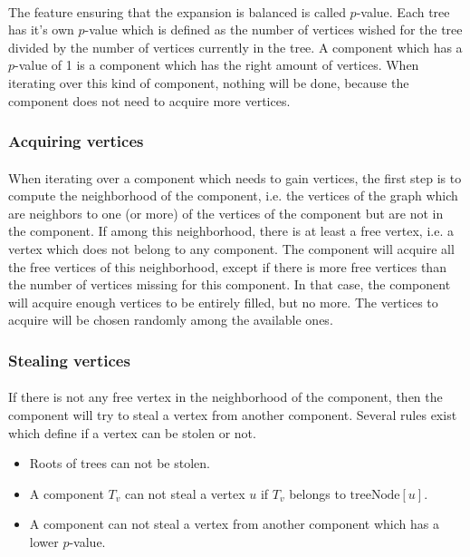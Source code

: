 \paragraph{}
The feature ensuring that the expansion is balanced is called $p$-value. Each
tree has it's own $p$-value which is defined as the number of vertices wished
for the tree divided by the number of vertices currently in the tree. A
component which has a $p$-value of 1 is a component which has the right amount
of vertices. When iterating over this kind of component, nothing will be done,
because the component does not need to acquire more vertices.

\subsubsection{Acquiring vertices}
\paragraph{}
When iterating over a component which needs to gain vertices, the first step
is to compute the neighborhood of the component, i.e. the vertices of the
graph which are neighbors to one (or more) of the vertices of the component
but are not in the component. If among this neighborhood, there is at least a
free vertex, i.e. a vertex which does not belong to any component. The
component will acquire all the free vertices of this neighborhood, except if
there is more free vertices than the number of vertices missing for this
component. In that case, the component will acquire enough vertices to be
entirely filled, but no more. The vertices to acquire will be chosen randomly
among the available ones.

\subsubsection{Stealing vertices}
\paragraph{}
If there is not any free vertex in the neighborhood of the component, then the
component will try to steal a vertex from another component. Several rules
exist which define if a vertex can be stolen or not.

\begin{itemize}
\item Roots of trees can not be stolen.
\item A component $T_v$ can not steal a vertex $u$ if $T_v$ belongs to
  $\mathrm{treeNode}[u]$.
\item A component can not steal a vertex from another component which has a
  lower $p$-value.
\end{itemize}

